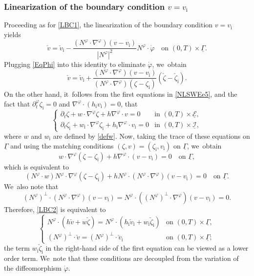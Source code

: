 \documentclass[11pt]{article}
\newcommand{\dt}{\partial_t}
\newcommand{\cI}{{\mathcal I}}
\newcommand{\cE}{{\mathcal E}}
\newcommand{\ul}[1]{\underline{#1}}
\newcommand{\itGamma}{\mathit{\Gamma}}
\theoremstyle{definition}
\begin{document}
\subsubsection{Linearization of the boundary condition $v=v_\mathrm{i}$}
Proceeding as for \eqref{LBC1}, the linearization of the boundary condition $v=v_\mathrm{i}$ yields
\[
\check{v}=\check{v}_\mathrm{i}-\frac{(N^\varphi\cdot\nabla^\varphi)(v-v_\mathrm{i})}{|N^\varphi|^2} N^\varphi\cdot\dot{\varphi}
\quad\text{on } (0,T)\times\ul{\itGamma}.
\]
Plugging \eqref{EqPhi} into this identity to eliminate $\dot{\varphi}$, we~obtain
\begin{equation}\label{LBC2}
\check{v} = \check{v}_\mathrm{i}
+ \frac{(N^\varphi\cdot\nabla^\varphi)(v-v_\mathrm{i})}{(N^\varphi\cdot\nabla^\varphi)(\zeta-\zeta_\mathrm{i})} (\check{\zeta}-\check{\zeta}_\mathrm{i}).
\end{equation}
On the other hand, it~follows from the first equations in \eqref{NLSWEe5},
and the fact that $\dt^\varphi\zeta_\mathrm{i}=0$ and $\nabla^\varphi\cdot(h_\mathrm{i}v_\mathrm{i})=0$, that
\[
\begin{cases}
\dt\zeta+w\cdot\nabla^\varphi\zeta+h\nabla^\varphi\cdot v=0 &\text{in } (0,T)\times\ul{\cE}, \\
\dt\zeta_\mathrm{i}+w_\mathrm{i}\cdot\nabla^\varphi\zeta_\mathrm{i}+h_\mathrm{i}\nabla^\varphi\cdot v_\mathrm{i}=0 &\text{in } (0,T)\times\ul{\cI},
\end{cases}
\]
where $w$ and $w_\mathrm{i}$ are defined by \eqref{defw}.
Now, taking the trace of these equations on $\ul{\itGamma}$ and using the matching conditions $(\zeta,v)=(\zeta_\mathrm{i},v_\mathrm{i})$ on $\ul{\itGamma}$, we~obtain
\[
w\cdot\nabla^\varphi(\zeta-\zeta_\mathrm{i})+h\nabla^\varphi\cdot(v-v_\mathrm{i})=0\quad \text{on }\ul{\itGamma},
\]
which is equivalent to
\[
(N^\varphi\cdot w)N^\varphi\cdot\nabla^\varphi(\zeta-\zeta_\mathrm{i})+hN^\varphi\cdot(N^\varphi\cdot\nabla^\varphi)(v-v_\mathrm{i})=0\quad \text{on }\ul{\itGamma}.
\]
We~also note that
\[
(N^\varphi)^\perp\cdot(N^\varphi\cdot\nabla^\varphi)(v-v_\mathrm{i})=N^\varphi\cdot((N^\varphi)^\perp\cdot\nabla^\varphi)(v-v_\mathrm{i})=0.
\]
Therefore, \eqref{LBC2} is equivalent to
\begin{equation}\label{LBC3}
\begin{cases}
N^\varphi\cdot(h\check{v}+w\check{\zeta})=N^\varphi\cdot(h_\mathrm{i}\check{v}_\mathrm{i}+w_\mathrm{i}\check{\zeta}_\mathrm{i}) &\text{on } (0,T)\times\ul{\itGamma}, \\
(N^\varphi)^\perp\cdot\check{v}=(N^\varphi)^\perp\cdot\check{v}_\mathrm{i} &\text{on } (0,T)\times\ul{\itGamma};
\end{cases}
\end{equation}
the term $w_\mathrm{i}\check{\zeta}_\mathrm{i}$ in the right-hand side of the first equation can be viewed as a lower order term. We~note that these conditions are decoupled from the variation of the diffeomorphism $\dot{\varphi}$.
\end{document}
